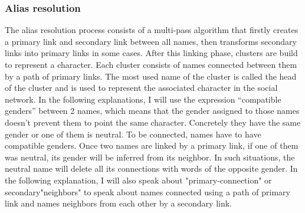 \documentclass[a4paper, 12pt]{report}
\begin{document}
\subsubsection{Alias resolution}
\label{section:alias}
The alias resolution process consists of a multi-pass algorithm that firstly creates a primary link and secondary link between all names,
then transforms secondary links into primary links in some cases. After this linking phase, clusters are build to represent a character.
Each cluster consists of names connected between them by a path of primary links.
The most used name of the cluster is called the head of the cluster and is used to represent the associated character in the social network.
In the following explanations, I will use the expression ``compatible genders'' between 2 names,
which means that the gender assigned to those names doesn't prevent them to point the same character.
Concretely they have the same gender or one of them is neutral. To be connected, names have to have compatible genders.
Once two names are linked by a primary link, if one of them was neutral, its gender will be inferred from its neighbor.
In such situations, the neutral name will delete all its connections with words of the opposite gender.
In the following explanation, I will also speak about "primary-connection" or secondary"neighbors" to speak about names connected using a path of primary link
and names neighbors from each other by a secondary link. \\
\end{document}
